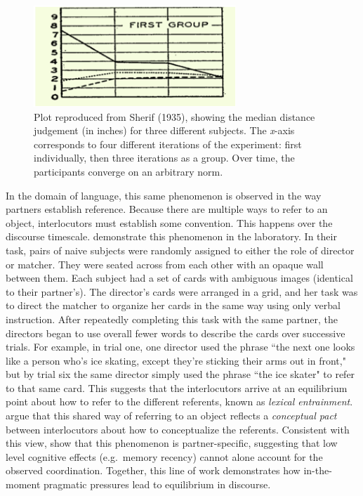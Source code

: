 \documentclass[man, noapacite, 12pt]{apa2}
\begin{document}
\begin{figure}
\begin{center} 
\includegraphics[width=3in]{figs/coordinatingmeaning.png}
\caption{\label{fig:results}  Plot reproduced from Sherif (1935), showing the median distance judgement (in inches) for three different subjects. The {\it x}-axis corresponds to four different iterations of the experiment: first individually, then three iterations as a group. Over time, the participants converge on an arbitrary norm.}
\end{center} 
\end{figure}

In the domain of language, this same phenomenon is observed in the way partners establish reference. Because there are multiple ways to refer to an object, interlocutors must establish some convention. This happens over the discourse timescale.  demonstrate this phenomenon in the laboratory. In their task, pairs of naive subjects were randomly assigned to either the role of director or matcher. They were seated across from each other with an opaque wall  between them. Each subject had a set of cards with ambiguous images (identical to their partner's). The director's cards were arranged in a grid, and her task was to direct the matcher to organize her cards in the same way using only verbal instruction. After repeatedly completing this task with the same partner, the directors began to use overall fewer words to describe the cards over successive trials. For example, in trial one, one director used the phrase ``the next one looks like a person who's ice skating, except they're sticking their arms out in front," but by trial six the same director simply used the phrase ``the ice skater" to refer to that same card. This suggests that the interlocutors arrive at an equilibrium point about how to refer to the different referents, known as {\it lexical entrainment}.  argue that this shared way of referring to an object reflects a {\it conceptual pact} between interlocutors about how to conceptualize the referents. Consistent with this view,  show that this phenomenon is partner-specific, suggesting that low level cognitive effects (e.g.\ memory recency) cannot alone account for the observed coordination. Together, this line of work demonstrates how in-the-moment pragmatic pressures lead to equilibrium in discourse.
\end{document}
